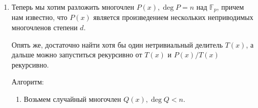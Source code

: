 \begin{enumerate}
\begin{proof}
	    \end{proof}

	    Оценка времени работы: 
	    \begin{enumerate}
	    	\item
				Вероятность того, что случайное $i$ подойдет, равна $\frac{1}{2}$.

				Как мы поняли из доказательства, мы хотим найти такое $i$, что ровно одно из чисел $z_*-i$ и $-z_*-i$ является квадратичным вычетом.
				Иначе говоря $\binom{z_*+i}{p} \ne \binom{-z_*+i}{p}$ (тут мы заменили $i$ на $-i$ для чуть более простой записи).

				На всякий случай, $\binom{a}{p}$ --- обозначение символа Лежандра.

				$\binom{z_*+i}{p} \ne \binom{-z_*+i}{p} \Rightarrow \binom{(z_*+i)/(z_*-i)}{p} = -1$.

				Заметим, что $i \rightarrow \frac{z_*+i}{z_*-i}$ --- биекция.
				Действительно, пусть $\frac{z_*+i}{z_*-i} = \frac{z_*+j}{z_*-j}$, то есть $(z_*+i)(z_*-j) = (z_*+j)(z_*-i)$, значит $2iz_*=2jz_* \Rightarrow i = j$.

			    Мы знаем, что невычетов ровно $\frac{p-1}{2}$, а случайное $i$ дает нам случайное $\frac{z_*+i}{z_*-i}$, 
			    поэтому с вероятностью $\frac{1}{2}$ $\frac{z_*+i}{z_*-i}$ будет невычетом, а значит ровно одно из чисел $z_*$ и $-z_*$ будет корнем $P(x)$,
			    и наш алгоритм завершится на этом шаге.

	    	\item
	    		$A(x)$ мы вычисляем с помощью бинарного возведения в степень, как в алгоритме для решение рекуррентных соотношений 
	    		(только здесь у нас степень всегда $O(1)$, поэтому работать будет за $O(\log p)$).

	    \end{enumerate}

		Итого, получили оценку матожидания времени работы $O(\log p)$.

	\item
		Теперь мы хотим разложить многочлен $P(x), \deg P = n$ над $\mathbb{F}_p$, 
		причем нам известно, что $P(x)$ является произведением нескольких неприводимых многочленов степени $d$.

		Опять же, достаточно найти хотя бы один нетривиальный делитель $T(x)$, а дальше можно запуститься рекурсивно от $T(x)$ и $P(x) / T(x)$ рекурсивно.

        Алгоритм:

		\begin{enumerate}
			\item
				Возьмем случайный многочлен $Q(x), \deg Q < n$.


\end{enumerate}
\end{enumerate}
